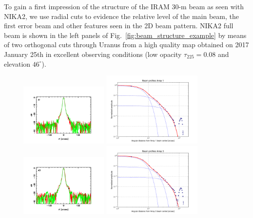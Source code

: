 To gain a first impression of the structure of the IRAM 30-m beam as
seen with NIKA2, we use radial cuts to evidence the relative level of
the main beam, the first error beam and other features seen in the 2D
beam pattern. NIKA2 full beam is shown in the left
panels of Fig.~\ref{fig:beam_structure_example} by means of two
orthogonal cuts through Uranus from a high quality map obtained on
2017 January 25th in excellent observing conditions
(low opacity $\tau_{225}=0.08$ and elevation $46^{\circ}$).


\begin{figure}[ht!]
  \begin{center}
    \includegraphics[clip=true, width=0.39\textwidth]{Figures/Array_A1_dB.pdf}
    \includegraphics[clip=true, trim={-0.5cm, -0.65cm, 0, 0}, width=0.44\textwidth]{Figures/Beam_profiles_A1_FR.pdf}
    \includegraphics[clip=true, width=0.39\textwidth]{Figures/Array_A3_dB.pdf}
    \includegraphics[clip=true, trim={-0.5cm, -0.65cm, 0, 0}, width=0.44\textwidth]{Figures/Beam_profiles_A3_FR.pdf}

\end{center}
\end{figure}
